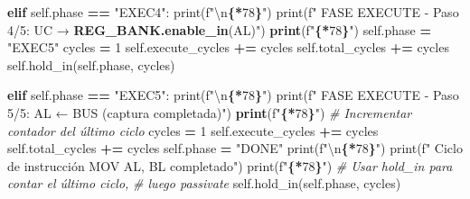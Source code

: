 \documentclass[12pt,oneside]{templates/unerthesis}
\newenvironment{Shaded}{\begin{snugshade}}{\end{snugshade}}
\newcommand{\BuiltInTok}[1]{#1}
\newcommand{\CharTok}[1]{\textcolor[rgb]{0.31,0.60,0.02}{#1}}
\newcommand{\CommentTok}[1]{\textcolor[rgb]{0.56,0.35,0.01}{\textit{#1}}}
\newcommand{\ControlFlowTok}[1]{\textcolor[rgb]{0.13,0.29,0.53}{\textbf{#1}}}
\newcommand{\DecValTok}[1]{\textcolor[rgb]{0.00,0.00,0.81}{#1}}
\newcommand{\ErrorTok}[1]{\textcolor[rgb]{0.64,0.00,0.00}{\textbf{#1}}}
\newcommand{\NormalTok}[1]{#1}
\newcommand{\OperatorTok}[1]{\textcolor[rgb]{0.81,0.36,0.00}{\textbf{#1}}}
\newcommand{\SpecialCharTok}[1]{\textcolor[rgb]{0.81,0.36,0.00}{\textbf{#1}}}
\newcommand{\SpecialStringTok}[1]{\textcolor[rgb]{0.31,0.60,0.02}{#1}}
\newcommand{\StringTok}[1]{\textcolor[rgb]{0.31,0.60,0.02}{#1}}
\newcommand{\VariableTok}[1]{\textcolor[rgb]{0.00,0.00,0.00}{#1}}
\begin{document}
\begin{Shaded}
\begin{Highlighting}[]
        \ControlFlowTok{elif} \VariableTok{self}\NormalTok{.phase }\OperatorTok{==} \StringTok{"EXEC4"}\NormalTok{:}
            \BuiltInTok{print}\NormalTok{(}\SpecialStringTok{f"}\CharTok{\textbackslash{}n}\SpecialCharTok{\{}\StringTok{\textquotesingle{}{-}\textquotesingle{}}\OperatorTok{*}\DecValTok{78}\SpecialCharTok{\}}\SpecialStringTok{"}\NormalTok{)}
            \BuiltInTok{print}\NormalTok{(}\SpecialStringTok{f"  FASE EXECUTE {-} Paso 4/5: UC → }
\ErrorTok{            REG\_BANK.enable\_in}\NormalTok{(AL)}\StringTok{")}
\ErrorTok{            print}\NormalTok{(}\SpecialStringTok{f"}\SpecialCharTok{\{}\StringTok{\textquotesingle{}{-}\textquotesingle{}}\OperatorTok{*}\DecValTok{78}\SpecialCharTok{\}}\SpecialStringTok{"}\NormalTok{)}
            \VariableTok{self}\NormalTok{.phase }\OperatorTok{=} \StringTok{"EXEC5"}
\NormalTok{            cycles }\OperatorTok{=} \DecValTok{1}
            \VariableTok{self}\NormalTok{.execute\_cycles }\OperatorTok{+=}\NormalTok{ cycles}
            \VariableTok{self}\NormalTok{.total\_cycles }\OperatorTok{+=}\NormalTok{ cycles}
            \VariableTok{self}\NormalTok{.hold\_in(}\VariableTok{self}\NormalTok{.phase, cycles)}
        
        \ControlFlowTok{elif} \VariableTok{self}\NormalTok{.phase }\OperatorTok{==} \StringTok{"EXEC5"}\NormalTok{:}
            \BuiltInTok{print}\NormalTok{(}\SpecialStringTok{f"}\CharTok{\textbackslash{}n}\SpecialCharTok{\{}\StringTok{\textquotesingle{}{-}\textquotesingle{}}\OperatorTok{*}\DecValTok{78}\SpecialCharTok{\}}\SpecialStringTok{"}\NormalTok{)}
            \BuiltInTok{print}\NormalTok{(}\SpecialStringTok{f"  FASE EXECUTE {-} Paso 5/5: AL ← BUS }
\ErrorTok{            }\NormalTok{(captura completada)}\StringTok{")}
\ErrorTok{            print}\NormalTok{(}\SpecialStringTok{f"}\SpecialCharTok{\{}\StringTok{\textquotesingle{}{-}\textquotesingle{}}\OperatorTok{*}\DecValTok{78}\SpecialCharTok{\}}\SpecialStringTok{"}\NormalTok{)}
            \CommentTok{\# Incrementar contador del último ciclo}
\NormalTok{            cycles }\OperatorTok{=} \DecValTok{1}
            \VariableTok{self}\NormalTok{.execute\_cycles }\OperatorTok{+=}\NormalTok{ cycles}
            \VariableTok{self}\NormalTok{.total\_cycles }\OperatorTok{+=}\NormalTok{ cycles}
            \VariableTok{self}\NormalTok{.phase }\OperatorTok{=} \StringTok{"DONE"}
            \BuiltInTok{print}\NormalTok{(}\SpecialStringTok{f"}\CharTok{\textbackslash{}n}\SpecialCharTok{\{}\StringTok{\textquotesingle{}{-}\textquotesingle{}}\OperatorTok{*}\DecValTok{78}\SpecialCharTok{\}}\SpecialStringTok{"}\NormalTok{)}
            \BuiltInTok{print}\NormalTok{(}\SpecialStringTok{f"  Ciclo de instrucción MOV AL, BL completado"}\NormalTok{)}
            \BuiltInTok{print}\NormalTok{(}\SpecialStringTok{f"}\SpecialCharTok{\{}\StringTok{\textquotesingle{}{-}\textquotesingle{}}\OperatorTok{*}\DecValTok{78}\SpecialCharTok{\}}\SpecialStringTok{"}\NormalTok{)}
            \CommentTok{\# Usar hold\_in para contar el último ciclo,}
            \CommentTok{\# luego passivate}
            \VariableTok{self}\NormalTok{.hold\_in(}\VariableTok{self}\NormalTok{.phase, cycles)}
        

\end{Highlighting}
\end{Shaded}
\end{document}
